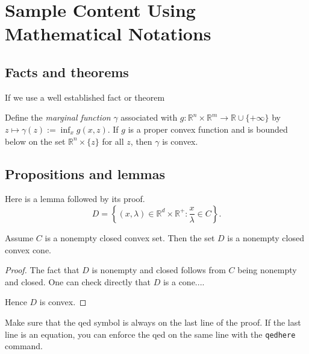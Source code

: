 \documentclass[msc,oneside]{ubcthesis}%
\newcommand{\R}{\mathbb{R}}   %
\begin{document}




\chapter{Sample Content Using Mathematical Notations}

\section{Facts and theorems}
If we use a well established fact or theorem\ 

\begin{fact}\cite[Theorem~IV.2.4.2]{Hiriart-Urruty:1993-ConvexAnalysis}\label{def:marginalfunc}
Define the \emph{marginal function} $\gamma$ associated with $g:\R^n\times\R^m\rightarrow \R\cup
\{+\infty\}$ by $z\mapsto \gamma(z):=\inf_x
g(x,z)$. If $g$ is a proper convex function and is bounded below on the set  $\R^n \times \{z\}$ for all $z$, then $\gamma$ is convex.
\end{fact}

\section{Propositions and lemmas}
Here is a lemma followed by its proof.
\[
D =\left\{ (x,\lambda)\in \R^d \times \R^+ : \frac{x}{\lambda} \in C\right\}.
\]

\begin{lemma}
Assume $C$ is a nonempty closed convex set. Then the set $D$ is a nonempty closed convex cone.
\end{lemma}

\begin{proof}
The fact that $D$ is nonempty and closed follows from $C$ being non\-empty and closed. One can check directly that $D$ is a cone....

Hence $D$ is convex.
\end{proof}
Make sure that the qed symbol is always on the last line of the proof. If the last line is an equation, you can enforce the qed on the same line with the \texttt{qedhere} command.
\end{document}
